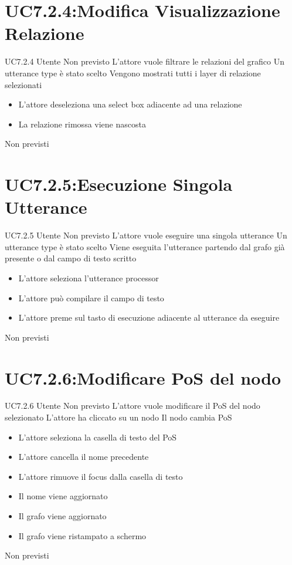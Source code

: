 \documentclass[../AnalisideiRequisiti.tex]{subfiles}
\begin{document}
\section{UC7.2.4:Modifica Visualizzazione Relazione}
\UserCase
{UC7.2.4}
{Utente}
{Non previsto}
{L'attore vuole filtrare le relazioni del grafico}
{Un utterance type è stato scelto }
{Vengono mostrati tutti i layer di relazione selezionati}
{
	\begin{itemize}
		\item{} L'attore deseleziona una select box adiacente ad una relazione
		\item{} La relazione rimossa viene nascosta
	\end{itemize}
}
{Non previsti}
\section{UC7.2.5:Esecuzione Singola Utterance}
\UserCase
{UC7.2.5}
{Utente}
{Non previsto}
{L'attore vuole eseguire una singola utterance}
{Un utterance type è stato scelto  }
{Viene eseguita l'utterance partendo dal grafo già presente o dal campo di testo scritto}
{
	\begin{itemize}
				\item{} L'attore seleziona l'utterance processor
		\item{} L'attore può compilare il campo di testo
		\item{} L'attore preme sul tasto di esecuzione adiacente al utterance da eseguire 
	\end{itemize}
}
{Non previsti}

\section{UC7.2.6:Modificare PoS del nodo}
\UserCase
{UC7.2.6}
{Utente}
{Non previsto}
{L'attore vuole modificare il PoS del nodo selezionato}
{L'attore ha cliccato su un nodo}
{Il nodo cambia PoS}
{
	\begin{itemize}
		\item{} L'attore seleziona la casella di testo del PoS
		\item{} L'attore cancella il nome precedente
		\item{} L'attore rimuove il focus dalla casella di testo
		\item{} Il nome viene aggiornato
		\item{} Il grafo viene aggiornato 
		\item{} Il grafo viene ristampato a schermo 
	\end{itemize}
}
{Non previsti}
\end{document}
